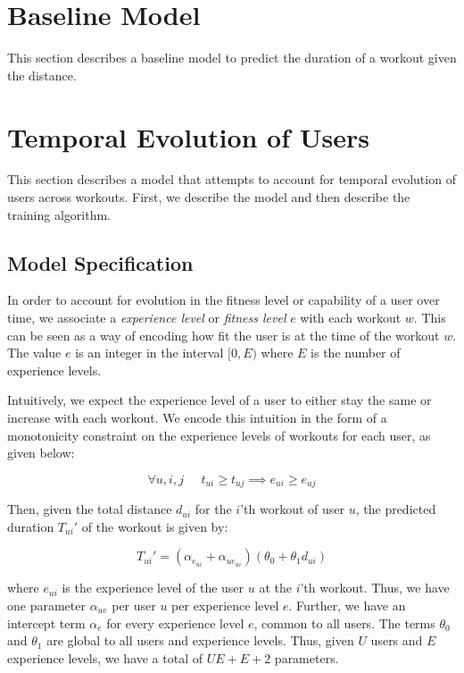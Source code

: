 \documentclass{acm_proc_article-sp}
\begin{document}
\begin{comment}
\begin{figure*}
\centering
\texttt{[image: plots/rating\_vs\_genre]}
\caption{\label{plotRatingVsGenre} Average rating for various movie genres}
\end{figure*}
\end{comment}

\section{Baseline Model}
\label{secBaselineModel}
This section describes a baseline model to predict the duration of a workout given the distance.

\section{Temporal Evolution of Users}
\label{secTemporalModelUsers}
This section describes a model that attempts to account for temporal evolution of users across workouts. First, we describe the model and then describe the training algorithm.

\subsection{Model Specification}
In order to account for evolution in the fitness level or capability of a user over time,  we associate a \emph{experience level} or \emph{fitness level} $e$ with each workout $w$. This can be seen as a way of encoding how fit the user is at the time of the workout $w$. The value $e$ is an integer in the interval $[0, E)$ where $E$ is the number of experience levels. 

Intuitively, we expect the experience level of a user to either stay the same or increase with each workout. We encode this intuition in the form of a monotonicity constraint on the experience levels of workouts for each user, as given below:

$$\forall u,i,j \;\;\;\;\; t_{ui} \geq t_{uj} \implies e_{ui} \geq e_{uj}$$

Then, given the total distance $d_{ui}$ for the $i$'th workout of user $u$, the predicted duration $T_{ui}'$ of the workout is given by:

$$T_{ui}' = (\alpha_{e_{ui}} + \alpha_{ue_{ui}})(\theta_0 + \theta_1 d_{ui})$$

where $e_{ui}$ is the experience level of the user $u$ at the $i$'th workout. Thus, we have one parameter $\alpha_{ue}$ per user $u$ per experience level $e$. Further, we have an intercept term $\alpha_e$ for every experience level $e$, common to all users. The terms $\theta_0$ and $\theta_1$ are global to all users and experience levels. Thus, given $U$ users and $E$ experience levels, we have a total of $UE + E + 2$ parameters.
\end{document}
